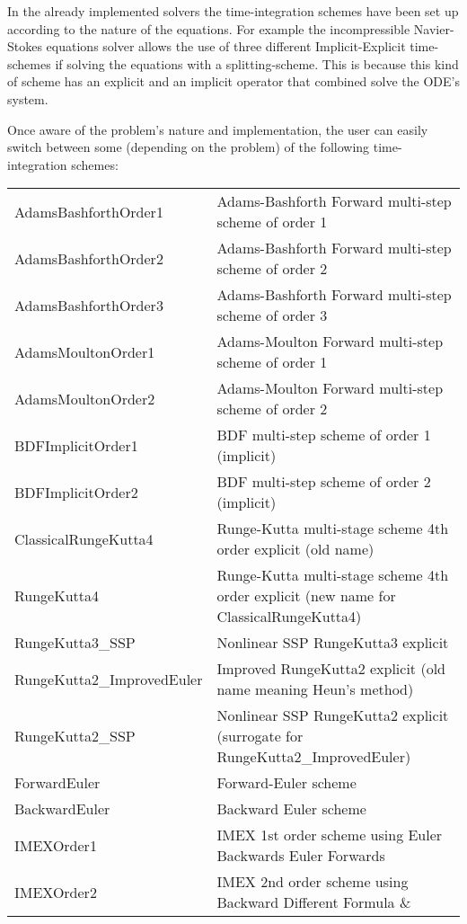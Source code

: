 In the already implemented solvers the time-integration schemes have been set up
according to the nature of the equations.
For example the incompressible Navier-Stokes equations solver allows the use of
three different Implicit-Explicit time-schemes if solving the equations with a
splitting-scheme.
This is because this kind of scheme has an explicit and an implicit operator
that combined solve the ODE's system.

Once aware of the problem's nature and implementation, the user can easily
switch between some (depending on the problem) of the following
time-integration schemes:

\begin{center}
\footnotesize
\begin{tabular}{p{4cm}p{10cm}}
\toprule
AdamsBashforthOrder1 & Adams-Bashforth Forward multi-step scheme of order 1\\
AdamsBashforthOrder2 & Adams-Bashforth Forward multi-step scheme of order 2\\
AdamsBashforthOrder3 & Adams-Bashforth Forward multi-step scheme of order 3\\
AdamsMoultonOrder1   & Adams-Moulton Forward multi-step scheme of order 1\\
AdamsMoultonOrder2   & Adams-Moulton Forward multi-step scheme of order 2\\
BDFImplicitOrder1    & BDF multi-step scheme of order 1 (implicit)\\
BDFImplicitOrder2    & BDF multi-step scheme of order 2 (implicit)\\
ClassicalRungeKutta4 & Runge-Kutta multi-stage scheme 4th order explicit (old name)\\
RungeKutta4 & Runge-Kutta multi-stage scheme 4th order explicit (new name for ClassicalRungeKutta4)\\
RungeKutta3\_SSP & Nonlinear SSP RungeKutta3 explicit\\
RungeKutta2\_ImprovedEuler & Improved RungeKutta2 explicit (old name meaning Heun's method)\\
RungeKutta2\_SSP & Nonlinear SSP RungeKutta2 explicit (surrogate for RungeKutta2\_ImprovedEuler)\\
ForwardEuler         & Forward-Euler scheme\\
BackwardEuler       & Backward Euler scheme\\
IMEXOrder1           & IMEX 1st order scheme using Euler Backwards Euler
                       Forwards \\
IMEXOrder2           & IMEX 2nd order scheme using Backward Different Formula \&

\end{tabular}
\end{center}
